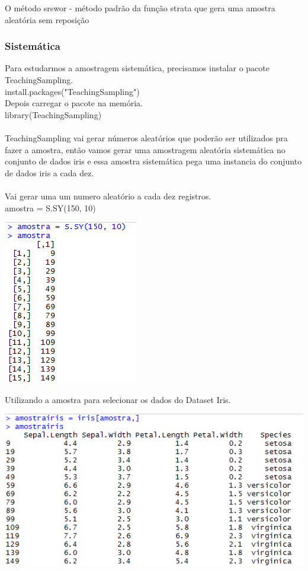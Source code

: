 O método srswor - método padrão da função strata que gera uma amostra aleatória sem reposição

\newpage

\subsubsection{Sistemática}

Para estudarmos a amostragem sistemática, precisamos  instalar o pacote TeachingSampling.
\\install.packages("TeachingSampling")
\\Depois carregar o pacote na memória.
\\library(TeachingSampling)
\\\\TeachingSampling vai gerar números aleatórios que poderão ser utilizados pra fazer a amostra, então vamos gerar uma amostragem aleatória sistemática no conjunto de dados iris 
e essa amostra sistemática pega uma instancia do conjunto de dados iris a cada dez.
\\\\Vai gerar uma um numero aleatório a cada dez registros.
\\amostra = S.SY(150, 10) \\

{\centering \includegraphics[scale=0.8]{cap1/Amostragem/amostragemSistematicaR1.png} \par}

Utilizando a amostra para selecionar os dados do Dataset Iris.\\

 {\centering \includegraphics[scale=0.8]{cap1/Amostragem/amostragemSistematicaR2.png} \par}
